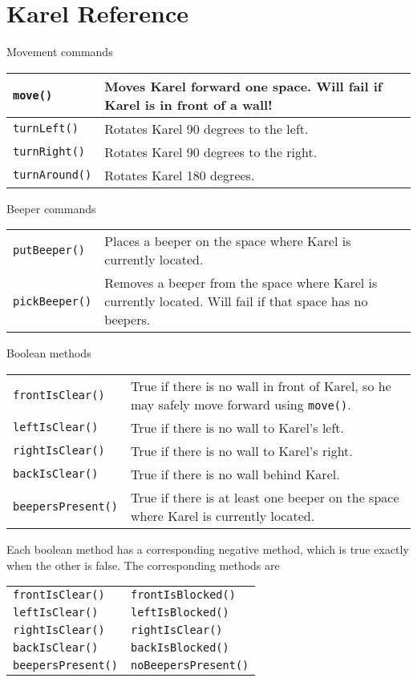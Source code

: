 \documentclass[11pt]{article}
\theoremstyle{plain}
\theoremstyle{definition}
\theoremstyle{remark}
\begin{document}
\section*{Karel Reference}
Movement commands
\begin{center}
  \begin{tabular}{|l|p{20em}|}
    \hline
    \texttt{move()} & Moves Karel forward one space. Will fail if Karel is in
    front of a wall! \\\hline
    \texttt{turnLeft()} & Rotates Karel 90 degrees to the left. \\
    \texttt{turnRight()} & Rotates Karel 90 degrees to the right. \\
    \texttt{turnAround()} & Rotates Karel 180 degrees. \\\hline
  \end{tabular}
\end{center}
Beeper commands
\begin{center}
  \begin{tabular}{|l|p{20em}|}
    \hline
    \texttt{putBeeper()} & Places a beeper on the space where Karel is currently
    located. \\
    \texttt{pickBeeper()} & Removes a beeper from the space where Karel is
    currently located. Will fail if that space has no beepers. \\\hline
  \end{tabular}
\end{center}
Boolean methods
\begin{center}
  \begin{tabular}{|l|p{20em}|}
    \hline
    \texttt{frontIsClear()} & True if there is no wall in front of Karel, so he
    may safely move forward using {\tt move()}. \\
    \texttt{leftIsClear()} & True if there is no wall to Karel's left. \\
    \texttt{rightIsClear()} & True if there is no wall to Karel's right. \\
    \texttt{backIsClear()} & True if there is no wall behind Karel. \\\hline
    \texttt{beepersPresent()} & True if there is at least one beeper on the
    space where Karel is currently located. \\\hline
  \end{tabular}
\end{center}
Each boolean method has a corresponding negative method, which is true exactly
when the other is false. The corresponding methods are
\begin{center}
  \begin{tabular}{|l|l|}
    \hline
    \texttt{frontIsClear()} & \texttt{frontIsBlocked()} \\
    \texttt{leftIsClear()} & \texttt{leftIsBlocked()} \\
    \texttt{rightIsClear()} & \texttt{rightIsClear()} \\
    \texttt{backIsClear()} & \texttt{backIsBlocked()} \\\hline
    \texttt{beepersPresent()} & \texttt{noBeepersPresent()} \\\hline
  \end{tabular}
\end{center}
\end{document}
